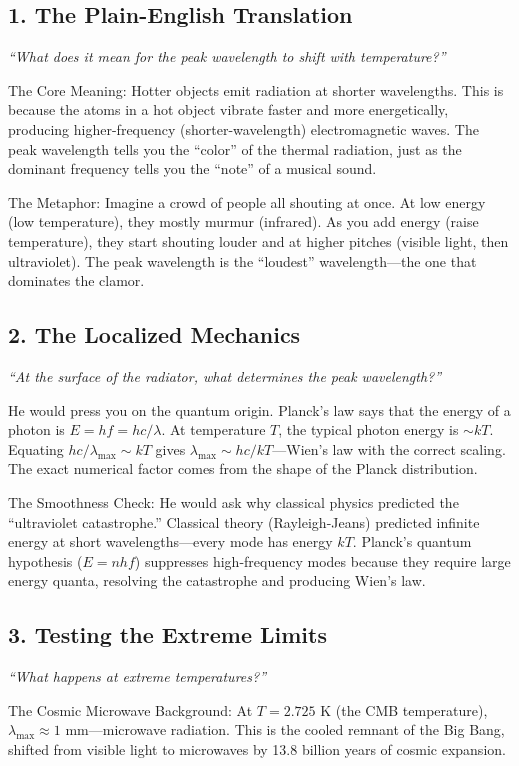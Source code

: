 \subsection*{1. The Plain-English Translation}
\textit{``What does it mean for the peak wavelength to shift with temperature?''}

The Core Meaning: Hotter objects emit radiation at shorter wavelengths. This is because the atoms in a hot object vibrate faster and more energetically, producing higher-frequency (shorter-wavelength) electromagnetic waves. The peak wavelength tells you the ``color'' of the thermal radiation, just as the dominant frequency tells you the ``note'' of a musical sound.

The Metaphor: Imagine a crowd of people all shouting at once. At low energy (low temperature), they mostly murmur (infrared). As you add energy (raise temperature), they start shouting louder and at higher pitches (visible light, then ultraviolet). The peak wavelength is the ``loudest'' wavelength---the one that dominates the clamor.

\subsection*{2. The Localized Mechanics}
\textit{``At the surface of the radiator, what determines the peak wavelength?''}

He would press you on the quantum origin. Planck's law says that the energy of a photon is $E = hf = hc/\lambda$. At temperature $T$, the typical photon energy is $\sim kT$. Equating $hc/\lambda_{\max} \sim kT$ gives $\lambda_{\max} \sim hc/kT$---Wien's law with the correct scaling. The exact numerical factor comes from the shape of the Planck distribution.

The Smoothness Check: He would ask why classical physics predicted the ``ultraviolet catastrophe.'' Classical theory (Rayleigh-Jeans) predicted infinite energy at short wavelengths---every mode has energy $kT$. Planck's quantum hypothesis ($E = nhf$) suppresses high-frequency modes because they require large energy quanta, resolving the catastrophe and producing Wien's law.

\subsection*{3. Testing the Extreme Limits}
\textit{``What happens at extreme temperatures?''}

The Cosmic Microwave Background: At $T = 2.725$ K (the CMB temperature), $\lambda_{\max} \approx 1$ mm---microwave radiation. This is the cooled remnant of the Big Bang, shifted from visible light to microwaves by 13.8 billion years of cosmic expansion.

